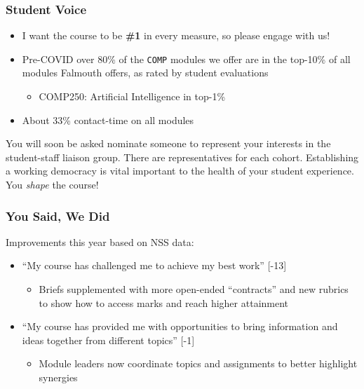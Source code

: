 \begin{frame}
	\frametitle{Student Voice}
			
	\begin{itemize}
		\item I want the course to be \textbf{\#1} in every measure, so please engage with us!
		\item Pre-COVID over 80\% of the \texttt{COMP} modules we offer are in the top-10\% of all modules Falmouth offers, as rated by student evaluations 
		\begin{itemize}
			\item COMP250: Artificial Intelligence in top-1\% 
		\end{itemize}	
		\item About 33\% contact-time on all modules
	\end{itemize}
	
	\vspace{1em}
	
	You will soon be asked nominate someone to represent your interests in the student-staff liaison group. There are representatives for each cohort. 
	Establishing a working democracy is vital important to the health of your student experience. You \textit{shape} the course!
	
\end{frame}

\begin{frame}
	\frametitle{You Said, We Did}
	
	Improvements this year based on NSS data: \pause
		
	\begin{itemize}
		\item ``My course has challenged me to achieve my best work'' [-13] 
		\begin{itemize}
			\item Briefs supplemented with more open-ended ``contracts'' and new rubrics to show how to access marks and reach higher attainment
		\end{itemize}	
		
		\pause\item ``My course has provided me with opportunities to bring information and ideas together from different topics'' [-1]
		\begin{itemize}
			\item Module leaders now coordinate topics and assignments to better highlight synergies 
		\end{itemize}	
		
	\end{itemize}
\end{frame}

